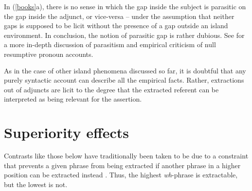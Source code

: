\documentclass[output=paper,biblatex,babelshorthands,newtxmath,draftmode,colorlinks,citecolor=brown]{langscibook}
\begin{document}
\eal  \label{books}
\zl

\noindent
In (\ref{books}a), there is no sense in which the gap inside the subject is parasitic on the gap
inside the adjunct, or vice-versa -- under the assumption that neither gaps is supposed to be licit
without the presence of a gap outside an island environment. In conclusion, the notion of parasitic
gap is rather dubious. See \citet[256--273]{levhubook} for a more in-depth discussion of parasitism and
empirical criticism of null resumptive pronoun accounts.

As in the case of other island phenomena discussed so far, it is doubtful that any purely syntactic
account can describe all the empirical facts.  Rather, extractions out of adjuncts are licit to the
degree that the extracted referent can be interpreted as being relevant for the assertion.




\section{Superiority effects}

Contrasts like those below have traditionally been taken to be due to a constraint that prevents a
given phrase from being extracted if another phrase in a higher position can be extracted instead
\citep{chomsky73,chomsky80}. Thus, the highest \emph{wh}-phrase is extractable, but the lowest is
not.

\eal  \label{badsc1}
\zl
\end{document}
